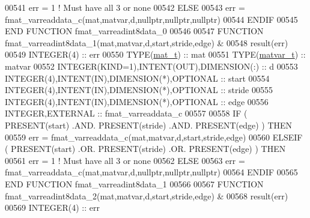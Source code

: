 \begin{DoxyCode}
00541         err = 1    \textcolor{comment}{! Must have all 3 or none}
00542     \textcolor{keywordflow}{ELSE}
00543         err = fmat\_varreaddata\_c(mat,matvar,d,nullptr,nullptr,nullptr)
00544 \textcolor{keywordflow}{    ENDIF}
00545 \textcolor{keyword}{END FUNCTION }fmat\_varreadint8data\_0
00546 
00547 \textcolor{keyword}{FUNCTION }fmat\_varreadint8data\_1(mat,matvar,d,start,stride,edge) &
00548                                                        result(err)
00549     \textcolor{keywordtype}{INTEGER(4)}                                  :: err
00550     \textcolor{keywordtype}{TYPE}(\hyperlink{group___m_a_t_gab0fc888f5a5d79943b16284b1f91c2e8}{mat\_t})                                 :: mat
00551     \textcolor{keywordtype}{TYPE}(\hyperlink{group___m_a_t_structmatvar__t}{matvar\_t})                              :: matvar
00552     \textcolor{keywordtype}{INTEGER(KIND=1)},\textcolor{keywordtype}{INTENT(OUT)},\textcolor{keywordtype}{DIMENSION(:)}    :: d
00553     \textcolor{keywordtype}{INTEGER(4)},\textcolor{keywordtype}{INTENT(IN)},\textcolor{keywordtype}{DIMENSION(*)},\textcolor{keywordtype}{OPTIONAL} :: start
00554     \textcolor{keywordtype}{INTEGER(4)},\textcolor{keywordtype}{INTENT(IN)},\textcolor{keywordtype}{DIMENSION(*)},\textcolor{keywordtype}{OPTIONAL} :: stride
00555     \textcolor{keywordtype}{INTEGER(4)},\textcolor{keywordtype}{INTENT(IN)},\textcolor{keywordtype}{DIMENSION(*)},\textcolor{keywordtype}{OPTIONAL} :: edge
00556     \textcolor{keywordtype}{INTEGER},\textcolor{keywordtype}{EXTERNAL}                            :: fmat\_varreaddata\_c
00557 
00558     \textcolor{keywordflow}{IF} ( \textcolor{keyword}{PRESENT}(start) .AND. \textcolor{keyword}{PRESENT}(stride) .AND. \textcolor{keyword}{PRESENT}(edge) ) \textcolor{keywordflow}{THEN}
00559         err = fmat\_varreaddata\_c(mat,matvar,d,start,stride,edge)
00560     \textcolor{keywordflow}{ELSEIF} ( \textcolor{keyword}{PRESENT}(start) .OR. \textcolor{keyword}{PRESENT}(stride) .OR. \textcolor{keyword}{PRESENT}(edge) ) \textcolor{keywordflow}{THEN}
00561         err = 1    \textcolor{comment}{! Must have all 3 or none}
00562     \textcolor{keywordflow}{ELSE}
00563         err = fmat\_varreaddata\_c(mat,matvar,d,nullptr,nullptr,nullptr)
00564 \textcolor{keywordflow}{    ENDIF}
00565 \textcolor{keyword}{END FUNCTION }fmat\_varreadint8data\_1
00566 
00567 \textcolor{keyword}{FUNCTION }fmat\_varreadint8data\_2(mat,matvar,d,start,stride,edge) &
00568                                                        result(err)
00569     \textcolor{keywordtype}{INTEGER(4)}                                  :: err

\end{DoxyCode}
